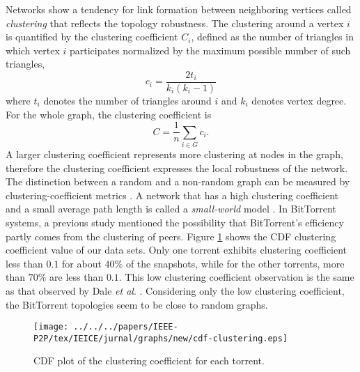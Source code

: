 Networks show a tendency for link formation between neighboring vertices called \textit{clustering} that reflects the topology robustness.
The clustering around a vertex $i$ is quantified by the clustering coefficient $C_i$, defined as the number of triangles in which vertex $i$ participates normalized by the maximum possible number of such triangles,
\begin{equation}
c_i = \frac{2t_i}{k_i(k_i - 1)} 
\end{equation}
where $t_i$ denotes the number of triangles around $i$ and $k_i$ denotes vertex degree.
For the whole graph, the clustering coefficient is
\begin{equation}
C = \frac{1}{n} \sum_{i \in G} c_i.
\end{equation} 
A larger clustering coefficient represents more clustering at nodes in the graph, therefore the clustering coefficient expresses the local robustness of the network.
The distinction between a random and a non-random graph can be measured by clustering-coefficient metrics \cite{watts1998collective}.
A network that has a high clustering coefficient and a small average path length is called a \textit{small-world} model \cite{watts1998collective}.
In BitTorrent systems, a previous study \cite{legout2007clustering} mentioned the possibility that BitTorrent's efficiency partly comes from the clustering of peers.
Figure \ref{fig:cdf-clustering} shows the CDF clustering coefficient value of our data sets.
Only one torrent exhibits clustering coefficient less than $0.1$ for about $40\%$ of the snapshots, while for the other torrents, more than  $70\%$ are less than $0.1$.
This low clustering coefficient observation is the same as that observed by Dale \textit{et al}. \cite{dale2008evolution}.
Considering only the low clustering coefficient, the BitTorrent topologies seem to be close to random graphs.

\begin{figure}[!tb] 
\begin{center}
\texttt{[image: ../../../papers/IEEE-P2P/tex/IEICE/jurnal/graphs/new/cdf-clustering.eps]}
\end{center}
\caption{CDF plot of the clustering coefficient for each torrent.}%
\label{fig:cdf-clustering}
\end{figure}

